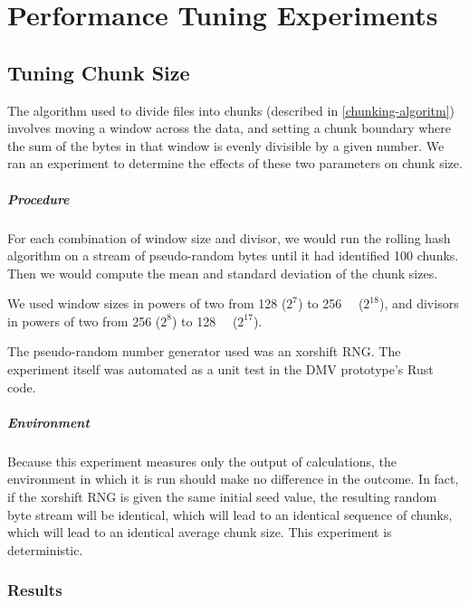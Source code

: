 \chapter{Performance Tuning Experiments}

\section{Tuning Chunk Size}

The algorithm used to divide files into chunks (described in
\autoref{chunking-algoritm}) involves moving a window across the data, and
setting a chunk boundary where the sum of the bytes in that window is evenly
divisible by a given number. We ran an experiment to determine the effects of
these two parameters on chunk size.

\paragraph{Procedure}

For each combination of window size and divisor, we would run the rolling hash
algorithm on a stream of pseudo-random bytes until it had identified \num{100}
chunks. Then we would compute the mean and standard deviation of the chunk
sizes.

We used window sizes in powers of two from \SI{128}{\byte} ($2^7$) to
\SI{256}{\kibi\byte} ($2^{18}$), and divisors in powers of two from \num{256}
($2^8$) to \SI{128}{\kibi\relax} ($2^{17}$).

The pseudo-random number generator used was an xorshift RNG\cite{xorshift_rng}.
The experiment itself was automated as a unit test in the DMV prototype's Rust
code.

\paragraph{Environment}

Because this experiment measures only the output of calculations, the
environment in which it is run should make no difference in the outcome. In
fact, if the xorshift RNG is given the same initial seed value, the resulting
random byte stream will be identical, which will lead to an identical sequence
of chunks, which will lead to an identical average chunk size. This experiment
is deterministic.


\subsection{Results}

